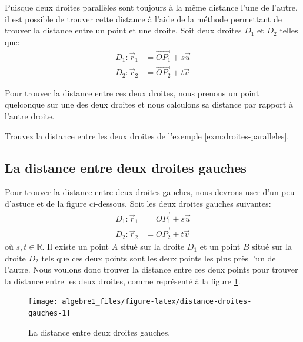 \documentclass[]{book}
\theoremstyle{definition}
\theoremstyle{definition}
\theoremstyle{definition}
\theoremstyle{remark}
\let\BeginKnitrBlock\begin \let\EndKnitrBlock\end
\begin{document}
Puisque deux droites parallèles sont toujours à la même distance l'une de l'autre, il est possible de trouver cette distance à l'aide de la méthode permettant de trouver la distance entre un point et une droite. Soit deux droites \(D_1\) et \(D_2\) telles que:
\begin{align*}
D_1 : \vec r_1 &= \overrightarrow{OP_1}+s\vec u \\
D_2 : \vec r_2 &= \overrightarrow{OP_2}+t\vec v
\end{align*}

Pour trouver la distance entre ces deux droites, nous prenons un point quelconque sur une des deux droites et nous calculons sa distance par rapport à l'autre droite.

\BeginKnitrBlock{example}
\protect\hypertarget{exm:unnamed-chunk-213}{}{\label{exm:unnamed-chunk-213} }Trouvez la distance entre les deux droites de l'exemple \ref{exm:droites-paralleles}.
\EndKnitrBlock{example}

\hypertarget{la-distance-entre-deux-droites-gauches}{%
\subsection{La distance entre deux droites gauches}\label{la-distance-entre-deux-droites-gauches}}

Pour trouver la distance entre deux droites gauches, nous devrons user d'un peu d'astuce et de la figure ci-dessous. Soit les deux droites gauches suivantes:
\begin{align*}
D_1 : \vec r_1 &= \overrightarrow{OP_1}+s\vec u \\
D_2 : \vec r_2 &= \overrightarrow{OP_2}+t\vec v 
\end{align*}
où \(s,t\in\mathbb{R}\). Il existe un point \(A\) situé sur la droite \(D_1\) et un point \(B\) situé sur la droite \(D_2\) tels que ces deux points sont les deux points les plus près l'un de l'autre. Nous voulons donc trouver la distance entre ces deux points pour trouver la distance entre les deux droites, comme représenté à la figure \ref{fig:distance-droites-gauches}.

\begin{figure}

{\centering \texttt{[image: algebre1\_files/figure-latex/distance-droites-gauches-1]} 

}

\caption{La distance entre deux droites gauches.}\label{fig:distance-droites-gauches}
\end{figure}
\end{document}
